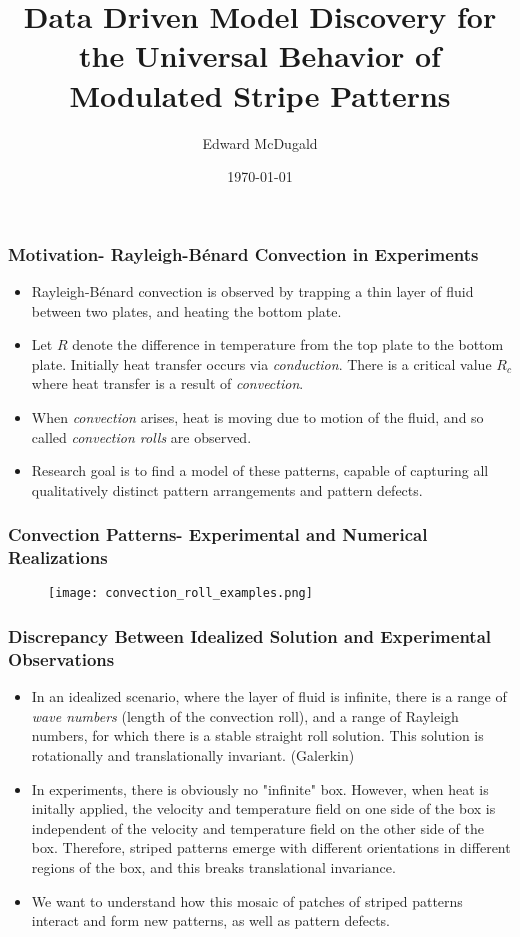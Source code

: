 \documentclass[]{beamer}
\title{Data Driven Model Discovery for the Universal Behavior of Modulated Stripe Patterns}
\author{Edward McDugald}
\institute{University of Arizona}
\date{\today}
\begin{document}
\begin{frame}
  \titlepage
\end{frame}

\begin{frame}
    \frametitle{Motivation- Rayleigh-B\'{e}nard Convection in Experiments}
    \begin{itemize}
        \item Rayleigh-B\'{e}nard convection is observed by trapping a thin layer of fluid between two plates, and heating the bottom plate.
        \item Let $R$ denote the difference in temperature from the top plate to the bottom plate. Initially heat transfer occurs via \emph{conduction}. There is a critical value $R_c$ where heat transfer is a result of \emph{convection}. 
        \item When \emph{convection} arises, heat is moving due to motion of the fluid, and so called \emph{convection rolls} are observed.
        \item Research goal is to find a model of these patterns, capable of capturing all qualitatively distinct pattern arrangements and pattern defects.
    \end{itemize}
\end{frame}

\begin{frame}
    \frametitle{Convection Patterns- Experimental and Numerical Realizations}

    \begin{figure}
        \centering
        \texttt{[image: convection\_roll\_examples.png]}
        \end{figure}
\end{frame}

\begin{frame}
    \frametitle{Discrepancy Between Idealized Solution and Experimental Observations}
    \begin{itemize}
        \item In an idealized scenario, where the layer of fluid is infinite, there is a range of \emph{wave numbers} (length of the convection roll), and a range of Rayleigh numbers, for which there is a stable straight roll solution. This solution is rotationally and translationally invariant. (Galerkin)
        \item In experiments, there is obviously no "infinite" box. However, when heat is initally applied, the velocity and temperature field on one side of the box is independent of the velocity and temperature field on the other side of the box. Therefore, striped patterns emerge with different orientations in different regions of the box, and this breaks translational invariance.
        \item We want to understand how this mosaic of patches of striped patterns interact and form new patterns, as well as pattern defects.
    \end{itemize}
\end{frame}
\end{document}

